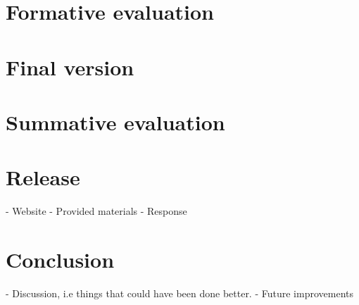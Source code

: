 \documentclass[11pt]{report}
\begin{document}
\chapter{Formative evaluation}

\chapter{Final version}

\chapter{Summative evaluation}

\chapter{Release}
- Website
- Provided materials
- Response

\chapter{Conclusion}
- Discussion, i.e things that could have been done better.
- Future improvements
\end{document}
